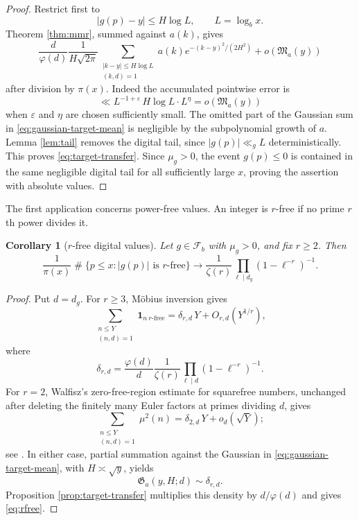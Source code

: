 \documentclass[11pt,reqno]{amsart}
\theoremstyle{plain}
\newtheorem{corollary}[theorem]{Corollary}
\theoremstyle{definition}
\newcommand{\eps}{\varepsilon}
\newcommand{\1}{\mathbf 1}
\DeclareMathOperator{\Card}{\#}
\begin{document}
\begin{proof}
Restrict first to
\[
 |g(p)-y|\le H\log L,
 \qquad L=\log_bx.
\]
Theorem \ref{thm:mmr}, summed against $a(k)$, gives
\[
 \frac d{\varphi(d)}\frac1{H\sqrt{2\pi}}
 \sum_{\substack{|k-y|\le H\log L\\(k,d)=1}}
 a(k)e^{-(k-y)^2/(2H^2)}+o(\mathfrak M_a(y))
\]
after division by $\pi(x)$.  Indeed the accumulated pointwise error is
\[
 \ll L^{-1+\eps}\,H\log L\cdot L^\eta=o(\mathfrak M_a(y))
\]
when $\eps$ and $\eta$ are chosen sufficiently small.  The omitted part of the Gaussian sum in \eqref{eq:gaussian-target-mean} is negligible by the subpolynomial growth of $a$.  Lemma \ref{lem:tail} removes the digital tail, since $|g(p)|\ll_gL$ deterministically.  This proves \eqref{eq:target-transfer}.  Since $\mu_g>0$, the event $g(p)\le0$ is contained in the same negligible digital tail for all sufficiently large $x$, proving the assertion with absolute values.
\end{proof}

The first application concerns power-free values.  An integer is $r$-free if no prime $r$th power divides it.

\begin{corollary}[$r$-free digital values]\label{cor:rfree}
Let $g\in\mathcal F_b$ with $\mu_g>0$, and fix $r\ge2$.  Then
\begin{equation}\label{eq:rfree}
 \frac1{\pi(x)}\Card\{p\le x:|g(p)|\text{ is }r\text{-free}\}
 \longrightarrow
 \frac1{\zeta(r)}
 \prod_{\ell\mid d_g}(1-\ell^{-r})^{-1}.
\end{equation}
\end{corollary}

\begin{proof}
Put $d=d_g$.  For $r\ge3$, M\"obius inversion gives
\[
 \sum_{\substack{n\le Y\\(n,d)=1}}\1_{n\ r\text{-free}}
 =\delta_{r,d}\,Y+O_{r,d}(Y^{1/r}),
\]
where
\[
 \delta_{r,d}
 =\frac{\varphi(d)}d\frac1{\zeta(r)}
 \prod_{\ell\mid d}(1-\ell^{-r})^{-1}.
\]
For $r=2$, Walfisz's zero-free-region estimate for squarefree numbers, unchanged after deleting the finitely many Euler factors at primes dividing $d$, gives
\[
 \sum_{\substack{n\le Y\\(n,d)=1}}\mu^2(n)
 =\delta_{2,d}\,Y+o_d(\sqrt Y);
\]
see \cite{walfisz}.  In either case, partial summation against the Gaussian in \eqref{eq:gaussian-target-mean}, with $H\asymp\sqrt y$, yields
\[
 \mathfrak G_a(y,H;d)\sim\delta_{r,d}.
\]
Proposition \ref{prop:target-transfer} multiplies this density by $d/\varphi(d)$ and gives \eqref{eq:rfree}.
\end{proof}
\end{document}
